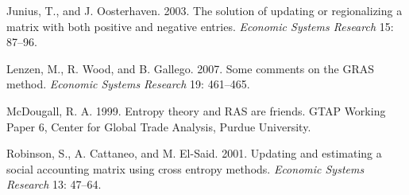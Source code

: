 \begin{list}{}{\setlength{\leftmargin}{2em}\setlength{\itemindent}{-2em}%
  \setlength{\itemsep}{2pt}\setlength{\parsep}{0pt}}
\item Junius, T., and J. Oosterhaven. 2003. The solution of updating or
regionalizing a matrix with both positive and negative entries.
\textit{Economic Systems Research} 15: 87--96.
\item Lenzen, M., R. Wood, and B. Gallego. 2007. Some comments on the GRAS
method. \textit{Economic Systems Research} 19: 461--465.
\item McDougall, R. A. 1999. Entropy theory and RAS are friends. GTAP Working
Paper 6, Center for Global Trade Analysis, Purdue University.
\item Robinson, S., A. Cattaneo, and M. El-Said. 2001. Updating and estimating
a social accounting matrix using cross entropy methods. \textit{Economic
Systems Research} 13: 47--64.
\end{list}


\begin{alsosee}
\end{alsosee}
